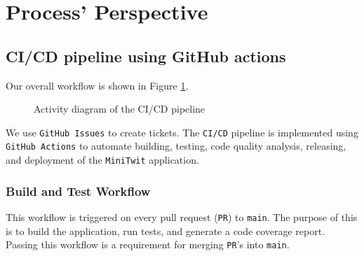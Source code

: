 \section{Process' Perspective}
\label{ch:background} 

\subsection{CI/CD pipeline using GitHub actions}
Our overall workflow is shown in Figure \ref{fig:activity_diagram}.
\begin{figure}[h]
      \centering
      \caption{Activity diagram of the CI/CD pipeline}
      \label{fig:activity_diagram}
\end{figure}

We use \texttt{GitHub Issues} to create tickets.
The \texttt{CI/CD} pipeline is implemented using \texttt{GitHub Actions} 
to automate building, testing, code quality analysis, releasing, 
and deployment of the \texttt{MiniTwit} application.

\subsubsection{Build and Test Workflow}
This workflow is triggered on every pull request (\texttt{PR}) to \texttt{main}.
The purpose of this is to build the application, run tests, 
and generate a code coverage report.
Passing this workflow is a requirement for merging 
\texttt{PR}'s into \texttt{main}.


